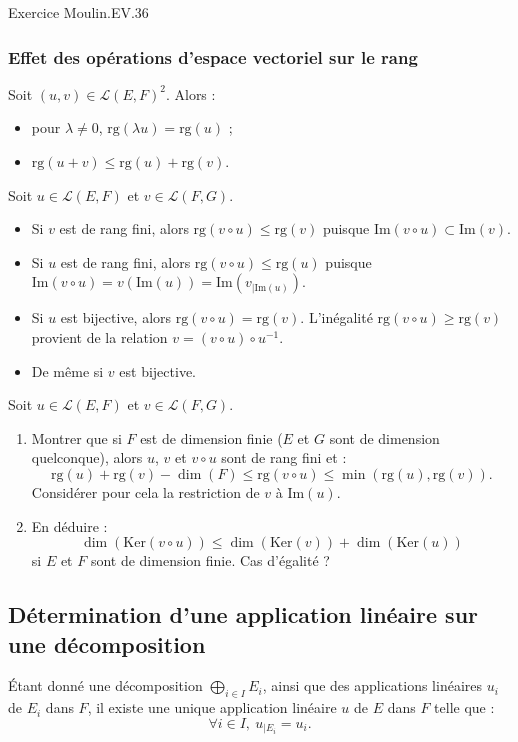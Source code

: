 \documentclass[french]{article}
\newcommand{\inv}{^{-1}}
\renewcommand{\ker}{\text{Ker}}
\newcommand{\rg}{\text{rg}}
\theoremstyle{plain}
\theoremstyle{definition}
\theoremstyle{remark}
\begin{document}
Exercice Moulin.EV.36

\subsubsection*{Effet des opérations d'espace vectoriel sur le rang}

Soit $(u,v)\in\mathcal{L}(E,F)^2$. Alors :
\begin{itemize}
	\item pour $\lambda\ne 0$, $\rg(\lambda u)=\rg(u)$ ;
	\item $\rg(u+v)\leqslant\rg(u)+\rg(v)$.
\end{itemize}
Soit $u\in\mathcal{L}(E,F)$ et $v\in\mathcal{L}(F,G)$.
\begin{itemize}
	\item Si $v$ est de rang fini, alors $\rg(v\circ u)\leqslant\rg(v)$ puisque $\text{Im}(v\circ u)\subset\text{Im}(v)$.
	\item Si $u$ est de rang fini, alors $\rg(v\circ u)\leqslant\rg(u)$ puisque $\text{Im}(v\circ u)=v(\text{Im}(u))=\text{Im}(v_{\mid \text{Im}(u)})$.
	\item Si $u$ est bijective, alors $\rg(v\circ u)=\rg(v)$. L'inégalité $\rg(v\circ u)\geqslant\rg(v)$ provient de la relation $v=(v\circ u)\circ u\inv$.
	\item De même si $v$ est bijective.
\end{itemize}

\begin{exo}
	Soit $u\in\mathcal{L}(E,F)$ et $v\in\mathcal{L}(F,G)$.
	\begin{enumerate}
		\item Montrer que si $F$ est de dimension finie ($E$ et $G$ sont de dimension quelconque), alors $u$, $v$ et $v\circ u$ sont de rang fini et : $$\rg(u)+\rg(v)-\dim(F)\leqslant\rg(v\circ u)\leqslant\min(\rg(u),\rg(v)).$$ Considérer pour cela la restriction de $v$ à $\text{Im}(u)$.
		\item En déduire : $$\dim(\ker(v\circ u))\leqslant\dim(\ker(v))+\dim(\ker(u))$$ si $E$ et $F$ sont de dimension finie. Cas d'égalité ?
	\end{enumerate}
\end{exo}

\subsection{Détermination d'une application linéaire sur une décomposition}

\begin{prop}%
	Étant donné une décomposition $\displaystyle\bigoplus_{i\in I} E_i$, ainsi que des applications linéaires $u_i$ de $E_i$ dans $F$, il existe une unique application linéaire $u$ de $E$ dans $F$ telle que : $$\forall i\in I,\ u_{\mid E_i}=u_i.$$
\end{prop}
\end{document}

